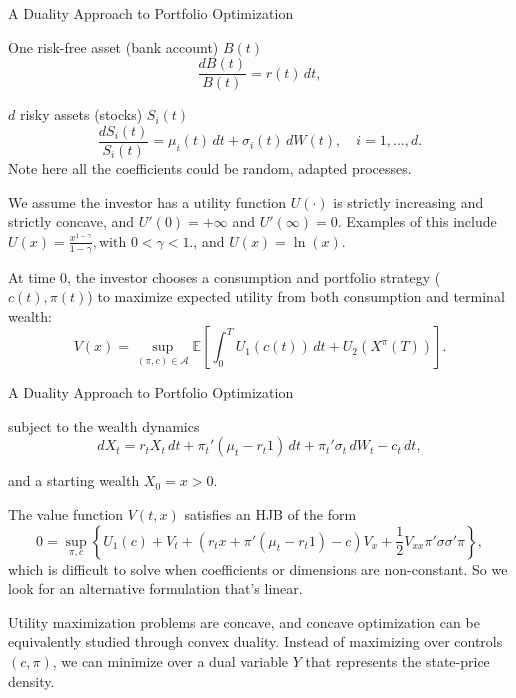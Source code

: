 \documentclass{beamer}
\begin{document}
\begin{frame}{A Duality Approach to Portfolio Optimization}

    {\footnotesize \footnotesize
    \par One risk-free asset (bank account) \( B(t) \)
    \[
\frac{dB(t)}{B(t)} = r(t) \, dt,
\]
\par \( d \) risky assets (stocks) \( S_i(t) \)
\[
\frac{dS_i(t)}{S_i(t)} = \mu_i(t) \, dt + \sigma_i(t) \, dW(t), \quad i = 1, \ldots, d.
\]
Note here all the coefficients could be random, adapted processes.
\vspace{1em}
\par  \pause We assume the investor has a utility function $ U(\cdot) $ is strictly increasing and strictly concave, and 
$ U'(0) = +\infty $ and $ U'(\infty) = 0 $. Examples of this include 
$U(x) = \frac{x^{1-\gamma}}{1-\gamma}, \text{with } 0 < \gamma < 1.$, and $ U(x) = \ln(x).$
\vspace{1em}
\par  \pause At time 0, the investor chooses a consumption and portfolio 
strategy ($ c(t), \pi(t) $) to maximize expected utility from both consumption and terminal wealth:
\[
V(x) = \sup_{(\pi,c) \in \mathcal{A}} \mathbb{E} \left[ \int_0^T U_1(c(t)) \, dt + U_2(X^\pi(T)) \right].
\]  
    }
\end{frame}

\begin{frame}{A Duality Approach to Portfolio Optimization}

    {\footnotesize \footnotesize
    subject to the wealth dynamics
\[
dX_t = r_t X_t \, dt + \pi_t' (\mu_t - r_t 1) \, dt + \pi_t' \sigma_t \, dW_t - c_t \, dt,
\]
\par and a starting wealth \(X_0 = x > 0\).
\vspace{1em}
\par \pause  The value function \(V(t, x)\) satisfies an HJB of the form
\[
0 = \sup_{\pi,c} \left\{ U_1(c) + V_t + (r_t x + \pi' (\mu_t - r_t 1) - c) V_x + \frac{1}{2} V_{xx} \pi' \sigma \sigma' \pi \right\},
\]
which is difficult to solve when coefficients or dimensions are non-constant.
 So we look for an alternative formulation that's linear.
 \vspace{1em}
 \par  \pause Utility maximization problems are concave, 
 and concave optimization can be equivalently studied through convex duality.
 Instead of maximizing over controls \((c, \pi)\),
  we can minimize over a dual variable \(Y\) that represents 
  the state-price density.

    }
\end{frame}
\end{document}
